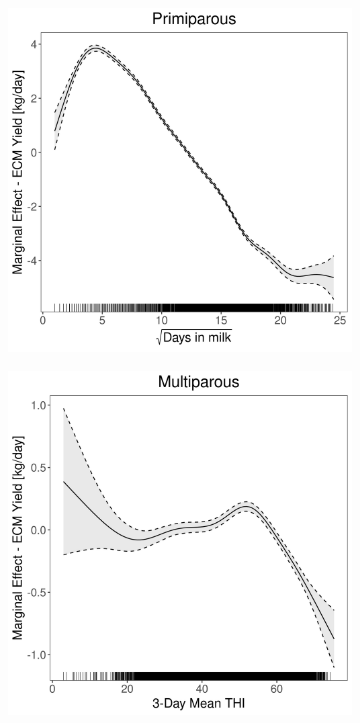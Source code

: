 \begin{figure}[H]
\begin{subfigure}[b]{0.45\textwidth}
    \end{subfigure}
    \hspace{0.05\textwidth} %
    \begin{subfigure}[b]{0.45\textwidth}
        \centering
        \includegraphics[width=\textwidth]{thesis/figures/models/ecm/before2010/je_ecm_before2010/je_ecm_before2010_marginal_dim_milk_primi.png}
    \end{subfigure}
    \begin{subfigure}[b]{0.45\textwidth}
        \centering
        \includegraphics[width=\textwidth]{thesis/figures/models/ecm/before2010/je_ecm_before2010/je_ecm_before2010_marginal_thi_milk_multi.png}

\end{subfigure}
\end{figure}
